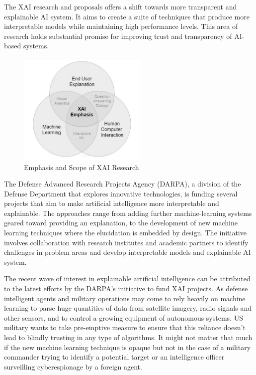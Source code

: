 The XAI research and proposals offers a shift towards more transparent and explainable AI system. It aims to create a suite of techniques that produce more interpretable models while maintaining high performance levels. This area of research holds substantial promise for improving trust and transparency of AI-based systems.

\begin{figure}[htbp]
\centering
\includegraphics[width=0.55\textwidth]{images/XAI-research-1-crop.png}
\caption{Emphasis and Scope of XAI Research}
\label{fig:xai-1}
\end{figure}

The Defense Advanced Research Projects Agency (DARPA), a division of the Defense Department that explores innovative technologies, is funding several projects that aim to make artificial intelligence more interpretable and explainable. The approaches range from adding further machine-learning systems geared toward providing an explanation, to the development of new machine learning techniques where the elucidation is embedded by design. The initiative involves collaboration with research institutes and academic partners to identify challenges in problem areas and develop interpretable models and explainable AI system.

The recent wave of interest in explainable artificial intelligence can be attributed to the latest efforts by the DARPA's initiative to fund XAI projects. As defense intelligent agents and military operations may come to rely heavily on machine learning to parse huge quantities of data from satellite imagery, radio signals and other sensors, and to control a growing equipment of autonomous systems. US military wants to take pre-emptive measure to ensure that this reliance doesn’t lead to blindly trusting in any type of algorithms. It might not matter that much if the new machine learning technique is opaque but not in the case of a military commander trying to identify a potential target \cite{Knight2017} or an intelligence officer surveilling cyberespionage by a foreign agent.

